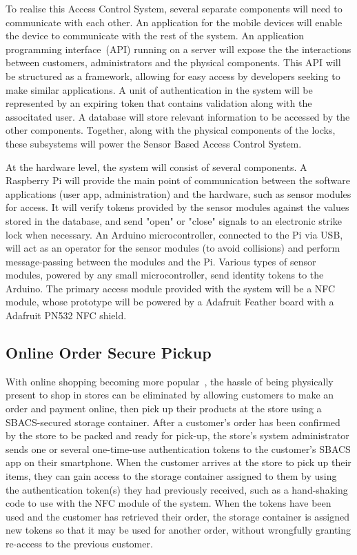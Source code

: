 \documentclass{article}
\begin{document}
To realise this Access Control System, several separate components will need to communicate with each other. An
application for the mobile devices will enable the device to communicate with the rest of the system. An application
programming interface~(API) running on a server will expose the the interactions between customers, administrators and
the physical components. This API will be structured as a framework, allowing for easy access by developers seeking to
make similar applications. A unit of authentication in the system will be represented by an expiring token that contains
validation along with the associtated user. A database will store relevant information to be accessed by the other
components. Together, along with the physical components of the locks, these subsystems will power the Sensor Based
Access Control System.

At the hardware level, the system will consist of several components. A Raspberry Pi will provide the main point of 
communication between the software applications (user app, administration) and the hardware, such as sensor modules for 
access. It will verify tokens provided by the sensor modules against the values stored in the database, and send "open" 
or "close" signals to an electronic strike lock when necessary. An Arduino microcontroller, connected to the Pi via 
USB, will act as an operator for the sensor modules (to avoid collisions) and perform message-passing between the 
modules and the Pi. Various types of sensor modules, powered by any small microcontroller, send identity tokens to the 
Arduino. The primary access module provided with the system will be a NFC module, whose prototype will be powered by a 
Adafruit Feather board with a Adafruit PN532 NFC shield.

\subsection{Online Order Secure Pickup}

With online shopping becoming more popular~\autocite{CUSTORA}, the hassle of being physically present to shop in stores 
can be eliminated by allowing customers to make an order and payment online, then pick up their products at the store 
using a SBACS-secured storage container. After a customer's order has been confirmed by the store to be packed 
and ready for pick-up, the store's system administrator sends one or several one-time-use authentication tokens 
to the customer's SBACS app on their smartphone. When the customer arrives at the store to pick up their items, 
they can gain access to the storage container assigned to them by using the authentication token(s) they had previously 
received, such as a hand-shaking code to use with the NFC module of the system. When the tokens have been used and the 
customer has retrieved their order, the storage container is assigned new tokens so that it may be used for another 
order, without wrongfully granting re-access to the previous customer.
\end{document}
